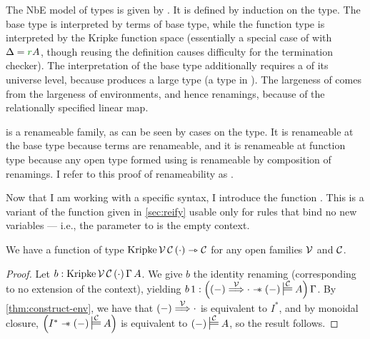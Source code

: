 
The NbE model of types is given by \AgdaFunction{\_$\vDash$\_}.
It is defined by induction on the type.
The base type is interpreted by terms of base type, while
the function type is interpreted by the Kripke function space (essentially a
special case of  with $\Delta = \gr rA$, though reusing
the  definition causes difficulty for the termination
checker).
The interpretation of the base type additionally requires a 
of its universe level, because  produces a large type
(a type in ).
The largeness of  comes from the largeness of
environments, and hence renamings, because of the relationally specified linear
map.


\AgdaFunction{\_$\vDash$\_} is a renameable family, as can be seen by cases on
the type.
It is renameable at the base type because terms are renameable, and it is
renameable at function type because any open type formed using
 is renameable by composition of renamings.
I refer to this proof of renameability as
.

Now that I am working with a specific syntax, I introduce the function
.
This is a variant of the  function given in \cref{sec:reify}
usable only for rules that bind no new variables --- i.e., the parameter
\AgdaBound{$\Delta$} to  is the empty context.

\begin{lemma}
  We have a function of type
  $\mathrm{Kripke}\,\V\,\C\,\plr{\cdot} \rightarrowtriangle \C$ for any open
  families $\mathcal V$ and $\mathcal C$.
\end{lemma}
\begin{proof}
  Let $b : \mathrm{Kripke}\,\V\,\C\,\plr{\cdot}\,\Gamma\,A$.
  We give $b$ the identity renaming (corresponding to no extension of the
  context), yielding
  $b\,1 : \plr{\plr{-} \env\V {\cdot} \wand \plr{-} \sdtstile{}\C A}\,\Gamma$.
  By \cref{thm:construct-env}, we have that $\plr{-} \env\V {\cdot}$ is
  equivalent to $I^*$, and by monoidal closure,
  $\plr{I^* \wand \plr{-} \sdtstile{}\C A}$ is equivalent to
  $\plr{-} \sdtstile{}\C A$, so the result follows.
\end{proof}

